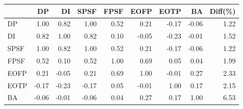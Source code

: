 \begin{tabular}{l|rrrrrrr|r}
\toprule
 & DP & DI & SPSF & FPSF & EOFP & EOTP & BA & Diff(\%)  \\
\midrule
DP & 1.00 & 0.82 & 1.00 & 0.52 & 0.21 & -0.17 & -0.06 & 1.22  \\
DI & 0.82 & 1.00 & 0.82 & 0.10 & -0.05 & -0.23 & -0.01 & 1.52  \\
SPSF & 1.00 & 0.82 & 1.00 & 0.52 & 0.21 & -0.17 & -0.06 & 1.22  \\
FPSF & 0.52 & 0.10 & 0.52 & 1.00 & 0.69 & 0.05 & 0.04 & 1.99  \\
EOFP & 0.21 & -0.05 & 0.21 & 0.69 & 1.00 & -0.01 & 0.27 & 2.33  \\
EOTP & -0.17 & -0.23 & -0.17 & 0.05 & -0.01 & 1.00 & 0.17 & 2.15  \\
BA & -0.06 & -0.01 & -0.06 & 0.04 & 0.27 & 0.17 & 1.00 & 6.53  \\
\bottomrule
\end{tabular}

